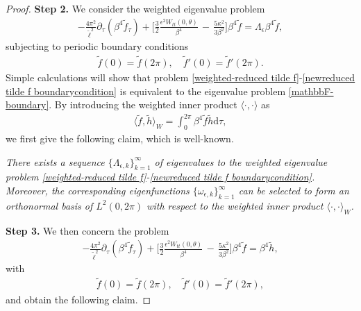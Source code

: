 \documentclass[10pt, reqno]{amsart}
\numberwithin{equation}{section}
\theoremstyle{definition}
\def\p{\partial}
\begin{document}
{\begin{proof}
\medskip
{\bf{Step 2.}}
We consider the weighted eigenvalue problem
\begin{align} \label{weighted-reduced tilde f}
- \frac{4\pi^2}{{\tilde\ell}^2} \p_\tau \left( \beta^4 {\tilde f}_\tau \right)
+
\Big[\frac 32\frac{\epsilon^2 W_{tt}(0, \theta)}{\beta^4}\,-\,\frac{5\kappa^2}{3\beta^2} \Big] \beta^4{\tilde f} = \Lambda_\epsilon \beta^4 {\tilde f},
\end{align}
subjecting to periodic boundary conditions
\begin{align} \label{newreduced tilde f boundarycondition}
\tilde f(0) = \tilde f(2\pi), \quad \tilde f'(0) = \tilde f'(2\pi).
\end{align}
Simple calculations will show that problem \eqref{weighted-reduced tilde f}-\eqref{newreduced tilde f boundarycondition} is
equivalent to the eigenvalue problem \eqref{mathbbF-boundary}.
By introducing the weighted inner product $\langle \cdot, \cdot\rangle$ as
\begin{align*}
 \langle {\tilde f}, {\tilde h}\rangle_{W} = \int_0^{2\pi} \beta^4 {\tilde f} {\tilde h}{\mathrm d}\tau,
\end{align*}
we first give the following claim, which is well-known.

\smallskip
{} \label{weighted eigenvalue problem lemma}
{\em
There exists a sequence $\{\Lambda_{\epsilon, k}\}_{k=1}^\infty$ of eigenvalues to the weighted eigenvalue problem \eqref{weighted-reduced tilde f}-\eqref{newreduced tilde f boundarycondition}.
Moreover, the corresponding eigenfunctions $\{\omega_{\epsilon, k}\}_{k=1}^\infty$ can be selected to form an orthonormal basis of $L^2(0, 2\pi)$ with respect to the weighted inner product $\langle \cdot, \cdot\rangle_W$.
}



\medskip
{\bf{Step 3.}}
We then concern the problem
\begin{align}
- \frac{4\pi^2}{{\tilde\ell}^2} \p_\tau \left( \beta^4 {\tilde f}_\tau \right)
+
\Big[\frac 32\frac{\epsilon^2 W_{tt}(0, \theta)}{\beta^4}\,-\,\frac{5\kappa^2}{3\beta^2} \Big] \beta^4{\tilde f} = \beta^4{\tilde h},
\label{weighted-reduced tilde f222222}
\end{align}
with
\begin{align}
\tilde f(0) = \tilde f(2\pi), \quad \tilde f'(0) = \tilde f'(2\pi),
\label{newreduced tilde f boundarycondition222222}
\end{align}
and obtain the following claim.


\end{proof}}
\end{document}
